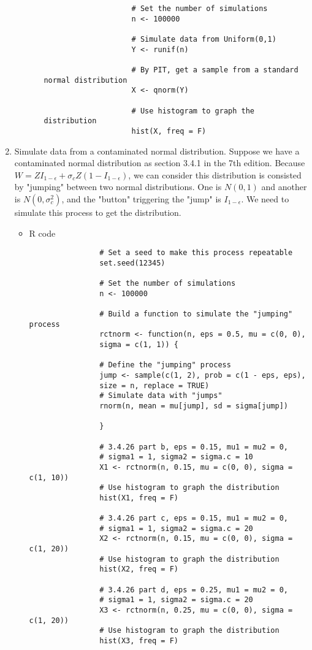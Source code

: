 \begin{enumerate}
\begin{enumerate}
\begin{itemize}
\begin{verbatim}
					# Set the number of simulations
					n <- 100000
					
					# Simulate data from Uniform(0,1)
					Y <- runif(n)
					
					# By PIT, get a sample from a standard normal distribution
					X <- qnorm(Y)
					
					# Use histogram to graph the distribution
					hist(X, freq = F)
					\end{verbatim}
				\end{itemize}
				
		\end{enumerate}
	\item Simulate data from a contaminated normal distribution. Suppose we have a contaminated normal distribution as section 3.4.1 in the 7th edition. Because $W = ZI_{1-\epsilon} + \sigma_c Z (1 - I_{1 - \epsilon})$, we can consider this distribution is consisted by "jumping" between two normal distributions. One is $N(0, 1)$ and another is $N(0, \sigma_c^2)$, and the "button" triggering the "jump" is $I_{1-\epsilon}$. We need to simulate this process to get the distribution.
		\begin{itemize}
			\item R code
			\begin{verbatim}
				# Set a seed to make this process repeatable
				set.seed(12345) 
				
				# Set the number of simulations
				n <- 100000
				
				# Build a function to simulate the "jumping" process
				rctnorm <- function(n, eps = 0.5, mu = c(0, 0), 
				sigma = c(1, 1)) {
				
				# Define the "jumping" process
				jump <- sample(c(1, 2), prob = c(1 - eps, eps), 
				size = n, replace = TRUE)
				# Simulate data with "jumps"
				rnorm(n, mean = mu[jump], sd = sigma[jump])
				
				}
				
				# 3.4.26 part b, eps = 0.15, mu1 = mu2 = 0, 
				# sigma1 = 1, sigma2 = sigma.c = 10
				X1 <- rctnorm(n, 0.15, mu = c(0, 0), sigma = c(1, 10))
				# Use histogram to graph the distribution
				hist(X1, freq = F)
				
				# 3.4.26 part c, eps = 0.15, mu1 = mu2 = 0, 
				# sigma1 = 1, sigma2 = sigma.c = 20
				X2 <- rctnorm(n, 0.15, mu = c(0, 0), sigma = c(1, 20))
				# Use histogram to graph the distribution
				hist(X2, freq = F)
				
				# 3.4.26 part d, eps = 0.25, mu1 = mu2 = 0, 
				# sigma1 = 1, sigma2 = sigma.c = 20
				X3 <- rctnorm(n, 0.25, mu = c(0, 0), sigma = c(1, 20))
				# Use histogram to graph the distribution
				hist(X3, freq = F)
				

\end{verbatim}
\end{itemize}
\end{enumerate}
